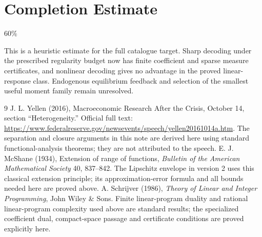 \documentclass[11pt]{article}
\theoremstyle{definition}
\begin{document}
\section{Completion Estimate}
60\%

This is a heuristic estimate for the full catalogue target. Sharp decoding
under the prescribed regularity budget now has finite coefficient and sparse
measure certificates, and nonlinear decoding gives no advantage in the
proved linear-response class. Endogenous equilibrium feedback and selection
of the smallest useful moment family remain unresolved.

\begin{thebibliography}{9}
 J. L. Yellen (2016), Macroeconomic Research After the Crisis, October 14, section ``Heterogeneity.'' Official full text: \url{https://www.federalreserve.gov/newsevents/speech/yellen20161014a.htm}. The separation and closure arguments in this note are derived here using standard functional-analysis theorems; they are not attributed to the speech.
 E. J. McShane (1934), Extension of range of functions,
\emph{Bulletin of the American Mathematical Society} 40, 837--842.
The Lipschitz envelope in version 2 uses this classical extension principle;
its approximation-error formula and all bounds needed here are proved above.
 A. Schrijver (1986), \emph{Theory of Linear and Integer
Programming}, John Wiley \& Sons. Finite linear-program duality and rational
linear-program complexity used above are standard results; the specialized
coefficient dual, compact-space passage and certificate conditions are
proved explicitly here.
\end{thebibliography}
\end{document}
